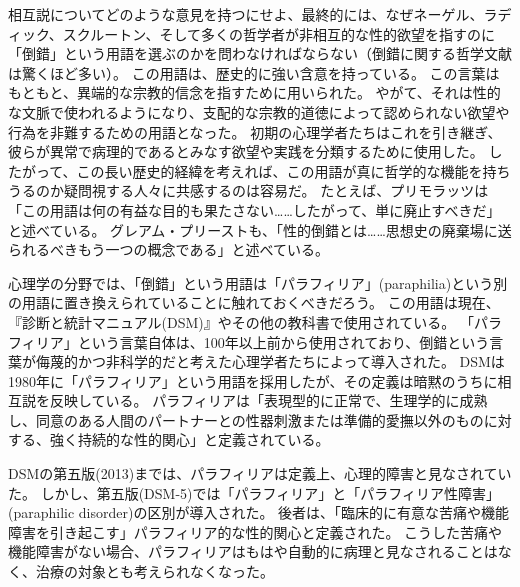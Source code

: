 \documentclass[paper=a4,book,openany]{jlreq}
\newcommand{\ig}[1]{}           %
\begin{document}
相互説についてどのような意見を持つにせよ、最終的には、なぜネーゲル、ラディック、スクルートン、そして多くの哲学者が非相互的な性的欲望を指すのに「倒錯」という用語を選ぶのかを問わなければならない（倒錯に関する哲学文献は驚くほど多い）。
この用語は、歴史的に強い含意を持っている。
この言葉はもともと、異端的な宗教的信念を指すために用いられた。
やがて、それは性的な文脈で使われるようになり、支配的な宗教的道徳によって認められない欲望や行為を非難するための用語となった。
初期の心理学者たちはこれを引き継ぎ、彼らが異常で病理的であるとみなす欲望や実践を分類するために使用した。
したがって、この長い歴史的経緯を考えれば、この用語が真に哲学的な機能を持ちうるのか疑問視する人々に共感するのは容易だ。
たとえば、プリモラッツは「この用語は何の有益な目的も果たさない……したがって、単に廃止すべきだ」と述べている\citep[p.64]{primoratz99:_ethic_and_sex}。
グレアム・プリーストも、「性的倒錯とは……思想史の廃棄場に送られるべきもう一つの概念である」と述べている\citep[p.371]{priest97:_sexual_perver}。

心理学の分野では、「倒錯」という用語は「パラフィリア」(paraphilia)という別の用語に置き換えられていることに触れておくべきだろう。
この用語は現在、『診断と統計マニュアル(DSM)』\ig{診断と統計マニュアル}やその他の教科書で使用されている。
「パラフィリア」という言葉自体は、100年以上前から使用されており、倒錯という言葉が侮蔑的かつ非科学的だと考えた心理学者たちによって導入された。
DSMは1980年に「パラフィリア」という用語を採用したが、その定義は暗黙のうちに相互説を反映している。
パラフィリアは「表現型的に正常で、生理学的に成熟し、同意のある人間のパートナーとの性器刺激または準備的愛撫以外のものに対する、強く持続的な性的関心」と定義されている\citep[p.685]{APA13:DSM}。

DSMの第五版(2013)までは、パラフィリアは定義上、心理的障害と見なされていた。
しかし、第五版(DSM-5)では「パラフィリア」と「パラフィリア性障害」(paraphilic disorder)の区別が導入された。
後者は、「臨床的に有意な苦痛や機能障害を引き起こす」パラフィリア的な性的関心と定義された\citep[p.694]{APA13:DSM}\ig{診断と統計マニュアル}。
こうした苦痛や機能障害がない場合、パラフィリアはもはや自動的に病理と見なされることはなく、治療の対象とも考えられなくなった。
\end{document}
